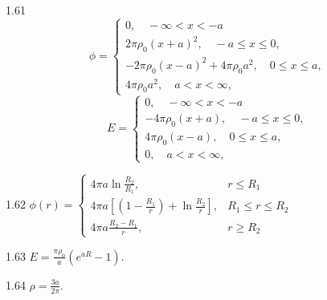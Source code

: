 \begin{Solution}{1.{61}}
		\[
		\phi = \begin{cases}
				0, \quad -\infty< x < -a \\
				2\pi\rho_0 (x+a)^2, \quad -a \le x \le 0, \\
				-2\pi\rho_0 (x-a)^2 + 4\pi\rho_0a^2, \quad 0 \le x \le a, \\
				4\pi\rho_0a^2, \quad a < x < \infty,
				\end{cases}
		\]
		\[
		E = \begin{cases}
				0, \quad -\infty< x < -a \\
				-4\pi\rho_0 (x+a), \quad -a \le x \le 0, \\
				4\pi\rho_0 (x-a), \quad 0 \le x \le a, \\
				0, \quad a < x < \infty,
				\end{cases}
		\]
	
\end{Solution}
\begin{Solution}{1.{62}}
	$
		\phi(r) =
		\begin{cases}
			4\pi a\ln\frac{R_2}{R_1},                                                  & r \le R_1         \\
			4\pi a \left[ \left( 1- \frac{R_1}{r}\right)  + \ln\frac{R_2}{r} \right] , & R_1 \le r \le R_2 \\
			4\pi a \frac{R_2 - R_1}{r},                                                & r \ge R_2
		\end{cases}
	$
\end{Solution}
\begin{Solution}{1.{63}}
	$E = \frac{\pi\rho_0}{a}(e^{aR} - 1)$.
\end{Solution}
\begin{Solution}{1.{64}}
	$\rho = \frac{3a}{2\pi}$.
\end{Solution}
